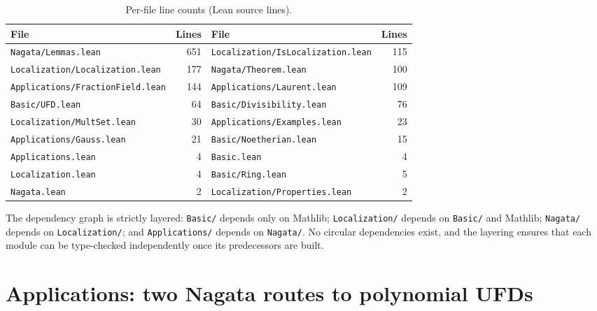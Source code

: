 \documentclass[11pt]{article}
\theoremstyle{plain}
\theoremstyle{definition}
\theoremstyle{remark}
\begin{document}
\begin{table}[ht]
\centering
\caption{Per-file line counts (Lean source lines).}\label{tab:loc}
\smallskip
\begin{tabular}{@{}lr@{\quad}lr@{}}
\toprule
\textbf{File} & \textbf{Lines} & \textbf{File} & \textbf{Lines} \\
\midrule
\texttt{Nagata/Lemmas.lean}             & 651
  & \texttt{Localization/IsLocalization.lean} & 115 \\
\texttt{Localization/Localization.lean} & 177
  & \texttt{Nagata/Theorem.lean}              & 100 \\
\texttt{Applications/FractionField.lean} & 144
  & \texttt{Applications/Laurent.lean}        & 109 \\
\texttt{Basic/UFD.lean}                 & 64
  & \texttt{Basic/Divisibility.lean}          & 76  \\
\texttt{Localization/MultSet.lean}      & 30
  & \texttt{Applications/Examples.lean}       & 23  \\
\texttt{Applications/Gauss.lean}        & 21
  & \texttt{Basic/Noetherian.lean}            & 15  \\
\texttt{Applications.lean}              & 4
  & \texttt{Basic.lean}                       & 4   \\
\texttt{Localization.lean}              & 4
  & \texttt{Basic/Ring.lean}                  & 5   \\
\texttt{Nagata.lean}                    & 2
  & \texttt{Localization/Properties.lean}    & 2   \\
\bottomrule
\end{tabular}
\end{table}

\noindent
The dependency graph is strictly layered: \texttt{Basic/} depends only on
Mathlib; \texttt{Localization/} depends on \texttt{Basic/} and Mathlib;
\texttt{Nagata/} depends on \texttt{Localization/}; and
\texttt{Applications/} depends on \texttt{Nagata/}.  No circular dependencies
exist, and the layering ensures that each module can be type-checked
independently once its predecessors are built.


\section{Applications: two Nagata routes to polynomial UFDs}\label{sec:application}
\end{document}
